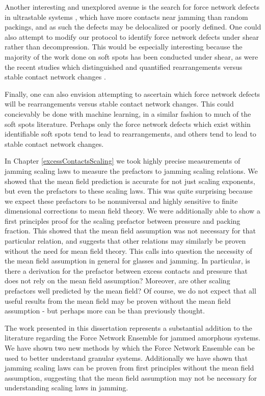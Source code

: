 Another interesting and unexplored avenue is the search for force network defects in ultrastable systems \cite{kapteijns_fast_2019,hagh_transient_2021,ninarello_models_2017}, which have more contacts near jamming than random packings, and as such the defects may be delocalized or poorly defined. One could also attempt to modify our protocol to identify force network defects under shear rather than decompression. This would be especially interesting because the majority of the work done on soft spots has been conducted under shear, as were the recent studies which distinguished and quantified rearrangements versus stable contact network changes \cite{morse_differences_2020,tuckman_contact_2020}.

Finally, one can also envision attempting to ascertain which force network defects will be rearrangements versus stable contact network changes. This could concievably be done with machine learning, in a similar fashion to much of the soft spots literature. Perhaps only the force network defects which exist within identifiable soft spots tend to lead to rearrangements, and others tend to lead to stable contact network changes. 

In Chapter \ref{excessContactsScaling} we took highly precise measurements of jamming scaling laws to measure the prefactors to jamming scaling relations. We showed that the mean field prediction is accurate for not just scaling exponents, but even the prefactors to these scaling laws. This was quite surprising because we expect these prefactors to be nonuniversal and highly sensitive to finite dimensional corrections to mean field theory. We were additionally able to show a first principles proof for the scaling prefactor between pressure and packing fraction. This showed that the mean field assumption was not necessary for that particular relation, and suggests that other relations may similarly be proven without the need for mean field theory. This calls into question the necessity of the mean field assumption in general for glasses and jamming. In particular, is there a derivation for the prefactor between excess contacts and pressure that does not rely on the mean field assumption? Moreover, are other scaling prefactors well predicted by the mean field?  Of course, we do not expect that all useful results from the mean field may be proven without the mean field assumption - but perhaps more can be than previously thought. 

The work presented in this dissertation represents a substantial addition to the literature regarding the Force Network Ensemble for jammed amorphous systems. We have shown two new methods by which the Force Network Ensemble can be used to better understand granular systems. Additionally we have shown that jamming scaling laws can be proven from first principles without the mean field assumption, suggesting that the mean field assumption may not be necessary for understanding scaling laws in jamming.
